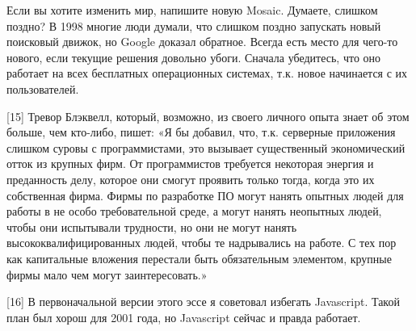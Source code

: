 \documentclass[ebook,12pt,oneside,openany]{memoir}
\begin{document}
Если вы хотите изменить мир, напишите новую Mosaic. Думаете, слишком
поздно? В 1998 многие люди думали, что слишком поздно запускать новый
поисковый движок, но Google доказал обратное. Всегда есть место для
чего-то нового, если текущие решения довольно убоги. Сначала
убедитесь, что оно работает на всех бесплатных операционных системах,
т.к. новое начинается с их пользователей.

[15] Тревор Блэквелл, который, возможно, из своего личного опыта знает
об этом больше, чем кто-либо, пишет: «Я бы добавил, что, т.к.
серверные приложения слишком суровы с программистами, это вызывает
существенный экономический отток из крупных фирм. От программистов
требуется некоторая энергия и преданность делу, которое они смогут
проявить только тогда, когда это их собственная фирма. Фирмы по
разработке ПО могут нанять опытных людей для работы в не особо
требовательной среде, а могут нанять неопытных людей, чтобы они
испытывали трудности, но они не могут нанять высококвалифицированных
людей, чтобы те надрывались на работе. С тех пор как капитальные
вложения перестали быть обязательным элементом, крупные фирмы мало чем
могут заинтересовать.»

[16] В первоначальной версии этого эссе я советовал избегать
Javascript. Такой план был хорош для 2001 года, но Javascript сейчас и
правда работает.
\end{document}

